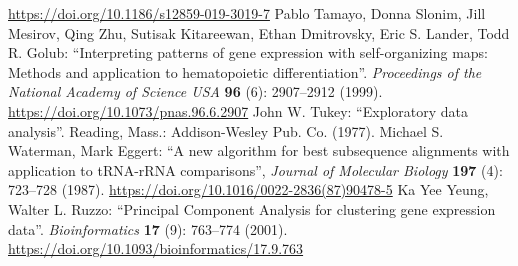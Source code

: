 \documentclass{report}
\begin{document}
\begin{thebibliography}{99}
\url{https://doi.org/10.1186/s12859-019-3019-7}
Pablo Tamayo, Donna Slonim, Jill Mesirov, Qing Zhu, Sutisak Kitareewan, Ethan Dmitrovsky, Eric S. Lander, Todd R. Golub: ``Interpreting patterns of gene expression with self-organizing maps: Methods and application to hematopoietic differentiation''. \textit{Proceedings of the National Academy of Science USA} {\bf 96} (6): 2907--2912 (1999). \url{https://doi.org/10.1073/pnas.96.6.2907}
John W. Tukey: ``Exploratory data analysis''. Reading, Mass.: Addison-Wesley Pub. Co. (1977).
Michael S. Waterman, Mark Eggert: ``A new algorithm for best subsequence alignments with application to tRNA-rRNA comparisons'', \textit{Journal of Molecular Biology} {\bf 197} (4): 723--728 (1987). \url{https://doi.org/10.1016/0022-2836(87)90478-5}
Ka Yee Yeung, Walter L. Ruzzo: ``Principal Component Analysis for clustering gene expression data''. \textit{Bioinformatics} {\bf 17} (9): 763--774 (2001).
\url{https://doi.org/10.1093/bioinformatics/17.9.763}
\end{thebibliography}
\end{document}
